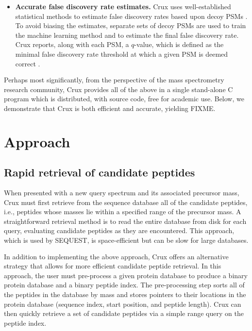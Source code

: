 \documentclass{bioinfo}
\renewcommand{\cite}{\citep}
\begin{document}
\begin{itemize}
\item {\bf Accurate false discovery rate estimates.}  Crux uses
  well-established statistical methods to estimate false discovery
  rates based upon decoy PSMs \cite{benjamini:controlling}.  To avoid
  biasing the estimates, separate sets of decoy PSMs are used to train
  the machine learning method and to estimate the final false
  discovery rate.  Crux reports, along with each PSM, a $q$-value,
  which is defined as the minimal false discovery rate threshold at
  which a given PSM is deemed correct \cite{storey:statistical}.

\end{itemize}

Perhaps most significantly, from the perspective of the mass
spectrometry research community, Crux provides all of the above in a
single stand-alone C program which is distributed, with source code,
free for academic use.  Below, we demonstrate that Crux is both
efficient and accurate, yielding FIXME.

\section{Approach}

\subsection{Rapid retrieval of candidate peptides}

When presented with a new query spectrum and its associated precursor
mass, Crux must first retrieve from the sequence database all of the
candidate peptides, i.e., peptides whose masses lie within a specified
range of the precursor mass.  A straightforward retrieval method is to
read the entire database from disk for each query, evaluating
candidate peptides as they are encountered.  This approach, which is
used by SEQUEST, is space-efficient but can be slow for large
databases.

In addition to implementing the above approach, Crux offers an
alternative strategy that allows for more efficient candidate peptide
retrieval.  In this approach, the user must pre-process a given
protein database to produce a binary protein database and a binary
peptide index.  The pre-processing step sorts all of the peptides in
the database by mass and stores pointers to their locations in the
protein database (sequence index, start position, and peptide length).
Crux can then quickly retrieve a set of candidate peptides via a
simple range query on the peptide index.
\end{document}
